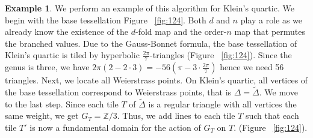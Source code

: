 \documentclass[12pt,reqno]{amsart}
\DeclareMathOperator{\Aut}{Aut}
\newcommand{\Z}{\mathbb{Z}}
\newcommand{\R}{\mathbb{R}}
\theoremstyle{definition}
\newtheorem{example}[theorem]{Example}
\theoremstyle{remark}
\newcommand{\ti}{\todo[inline]}
\begin{document}


\begin{example}
We perform an example of this algorithm for Klein's quartic. We begin with the base tessellation Figure~ \cref{fig:124}. Both $d$ and $n$ play a role as we already know the existence of the $d$-fold map and the order-$n$ map that permutes the branched values. Due to the Gauss-Bonnet formula, the base tessellation of Klein's quartic is tiled by hyperbolic $\frac{2 \pi}{7}$-triangles (Figure~ \cref{fig:124}). Since the genus is three, we have $2 \pi (2 - 2 \cdot 3) = -56 (\pi - 3 \cdot \frac{2 \pi}{7})$ hence we need 56 triangles. Next, we locate all Weierstrass points. On Klein's quartic, all vertices of the base tessellation correspond to Weierstrass points, that is $\Delta = \widetilde{\Delta}$. We move to the last step. Since each tile $T$ of $\widetilde{\Delta}$ is a regular triangle with all vertices the same weight, we get $G_T = \Z/3$. Thus, we add lines to each tile $T$ such that each tile $T'$ is now a fundamental domain for the action of $G_T$ on $T$. (Figure~ \cref{fig:124}).


 \end{example}





\end{document}
